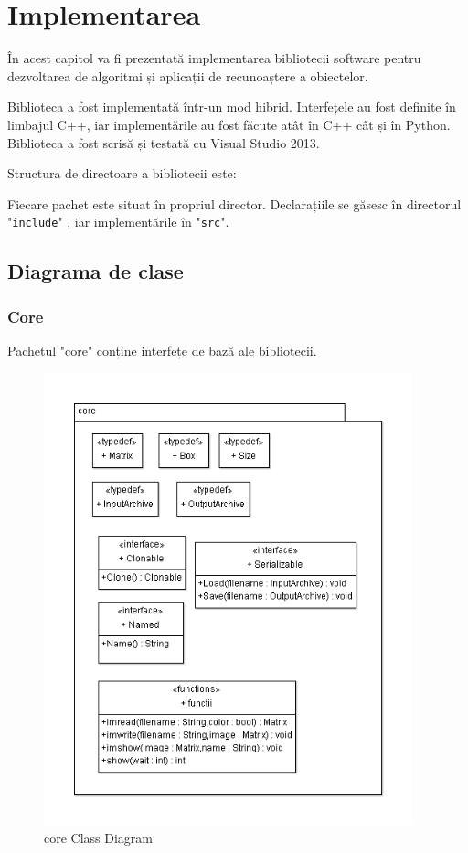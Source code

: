 \chapter{Implementarea}

În acest capitol va fi prezentată implementarea bibliotecii software pentru dezvoltarea de algoritmi și aplicații de recunoaștere a obiectelor.

Biblioteca a fost implementată într-un mod hibrid.
Interfețele au fost definite în limbajul C++, iar implementările au fost făcute atât în C++ cât și în Python.
Biblioteca a fost scrisă și testată cu Visual Studio 2013.


Structura de directoare a bibliotecii este:

Fiecare pachet este situat în propriul director.
Declarațiile se găsesc în directorul "\verb!include!"
, iar implementările în "\verb!src!".

\pagebreak
\section{Diagrama de clase}

\subsection{Core}
Pachetul "core" conține interfețe de bază ale bibliotecii.
\begin{figure}[H]
	\centering
		\includegraphics[width=0.95\textwidth]{uml/coreClassDiagram.png}
	\caption{core Class Diagram}
	\label{fig:coreClassDiagram}
\end{figure}

